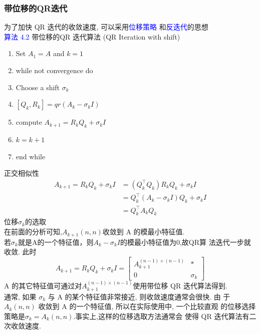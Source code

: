 \documentclass[12pt,a4paper]{article}
\begin{document}
\subsubsection{带位移的QR迭代}
为了加快 QR 迭代的收敛速度, 可以采用\textcolor{blue}{位移策略} 和\textcolor{blue}{反迭代}的思想\\
\textcolor{blue}{算法 4.2} 带位移的QR 迭代算法 (QR Iteration with shift)\\
\begin{enumerate}[1:]
	\item Set $A_{1}=A$ and $k=1$
	\item while not convergence do
	\item Choose a shift $\sigma_{k}$
	\item \qquad $[Q_{k},R_{k}]=qr(A_{k}-\sigma_{k}I)$
	\item \qquad compute $A_{k+1}=R_{k}Q_{k}+\sigma_{k}I$
	\item \qquad$k=k+1$
	\item end while
\end{enumerate}
正交相似性\\
$$
\begin{aligned} A_{k+1}=R_{k} Q_{k}+\sigma_{k} I &=\left(Q_{k}^{\top} Q_{k}\right) R_{k} Q_{k}+\sigma_{k} I \\ &=Q_{k}^{\top}\left(A_{k}-\sigma_{k} I\right) Q_{k}+\sigma_{k} I \\ &=Q_{k}^{\top} A_{k} Q_{k} \end{aligned}
$$
位移$\sigma_{k}$的选取\\
在前面的分析可知,$A_{k+1}(n, n)$收敛到 A 的模最小特征值.\\
若$\sigma_{k}$就是A的一个特征值，则$A_{k}-\sigma_{k} I$的模最小特征值为0,故QR算 法迭代一步就收敛. 此时
$$
A_{k+1}=R_{k} Q_{k}+\sigma_{k} I=\left[\begin{array}{cc}
{A_{k+1}^{(n-1) \times(n-1)}} & {*} \\
{0} & {\sigma_{k}}
\end{array}\right]
$$
A 的其它特征值可通过对$A_{k+1}^{(n-1) \times(n-1)}$使用带位移 QR 迭代算法得到.\\
通常, 如果 $\sigma_{k}$ 与 A 的某个特征值非常接近, 则收敛速度通常会很快. 由 于 $A_{k} (n, n)$ 收敛到 A 的一个特征值, 所以在实际使用中, 一个比较直观 的位移选择策略是$\sigma_{k} =A_{k}(n,n)$.事实上,这样的位移选取方法通常会 使得 QR 迭代算法有二次收敛速度.\\
\end{document}
